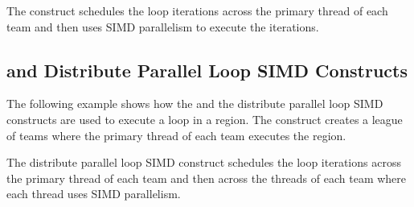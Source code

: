 The  construct schedules the loop iterations across 
the primary thread of each team and then uses SIMD parallelism to execute the iterations.



\subsection{ and Distribute Parallel Loop SIMD Constructs}
\label{subsec:teams_distribute_parallel_simd}

The following example shows how the  and the distribute 
parallel loop SIMD constructs are used to execute a loop in a  
region. The  construct creates a league of teams 
where the primary thread of each team executes the  region.

The distribute parallel loop SIMD construct schedules the loop iterations across 
the primary thread of each team and then across the threads of each team where each 
thread uses SIMD parallelism.




